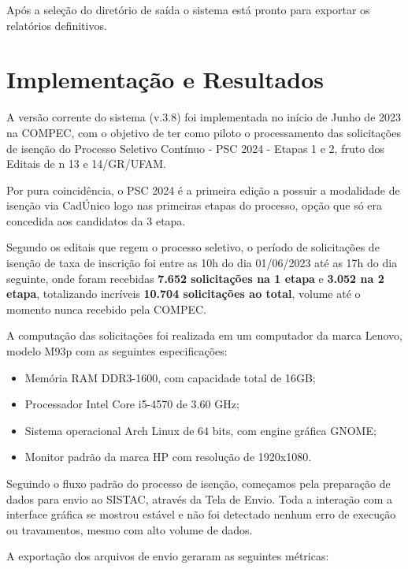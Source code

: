 \documentclass[
	12pt,			%
	openright,		%
	oneside,	
	a4paper,		%
	english,		%
	brazil			%
]{abntex2/abntex2}  %
\begin{document}
	Após a seleção do diretório de saída o sistema está pronto para exportar os relatórios definitivos.

	\chapter{Implementação e Resultados}
	
	A versão corrente do sistema (v.3.8) foi implementada no início de Junho de 2023 na COMPEC, com o objetivo de ter como piloto o processamento das solicitações de isenção do Processo Seletivo Contínuo - PSC 2024 - Etapas 1 e 2, fruto dos Editais de n{\textdegree} 13 e 14/GR/UFAM.
	
	Por pura coincidência, o PSC 2024 é a primeira edição a possuir a modalidade de isenção via CadÚnico logo nas primeiras etapas do processo, opção que só era concedida aos candidatos da 3{\textordfeminine} etapa.
	
	Segundo os editais que regem o processo seletivo, o período de solicitações de isenção de taxa de inscrição foi entre as 10h do dia 01/06/2023 até as 17h do dia seguinte, onde foram recebidas \textbf{7.652 solicitações na 1{\textordfeminine} etapa} e \textbf{3.052 na 2{\textordfeminine} etapa}, totalizando incríveis \textbf{10.704 solicitações ao total}, volume até o momento nunca recebido pela COMPEC.
	
	A computação das solicitações foi realizada em um computador da marca Lenovo, modelo M93p com as seguintes especificações:
	
	\begin{itemize}
		
		\item Memória RAM DDR3-1600, com capacidade total de 16GB;
		\item Processador Intel{\textregistered} Core{\texttrademark} i5-4570 de 3.60 GHz;
		\item Sistema operacional Arch Linux de 64 bits, com engine gráfica GNOME;
		\item Monitor padrão da marca HP com resolução de 1920x1080.
		
	\end{itemize}
	
	Seguindo o fluxo padrão do processo de isenção, começamos pela preparação de dados para envio ao SISTAC, através da Tela de Envio. Toda a interação com a interface gráfica se mostrou estável e não foi detectado nenhum erro de execução ou travamentos, mesmo com alto volume de dados.
	
	A exportação dos arquivos de envio geraram as seguintes métricas:
	
\end{document}
